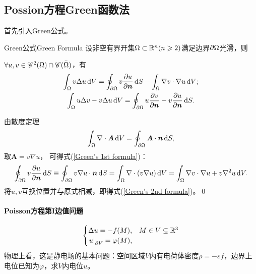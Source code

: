 \subsection{Possion方程Green函数法}
首先引入Green公式。
\begin{theorem}{Green公式}{Green Formula}
	设非空有界开集$\Omega\subset\mathbb R^n(n\geqslant 2)$满足边界$\partial\Omega$光滑，则
	
	$\forall u,v\in\mathscr C^2(\Omega)\cap\mathscr C(\bar\Omega)$，有
	\begin{gather}\label{Green's 1st formula}
		\int_\Omega v\lap u\d V=\oint_{\p\Omega}v\pv u{\bm n}\d S-\int_\Omega\nabla v\cdot\nabla u\d V;\\\label{Green's 2nd formula}
		\int_\Omega u\lap v-v\lap u\d V=\oint_{\p\Omega}u\pv v{\bm n}-v\pv u{\bm n}\d S.
	\end{gather}
\end{theorem}
\prf 由散度定理
\begin{align}
	\int_\Omega\nabla\cdot\bm A\mathop{}\!\mathrm{d} V=\oint_{\partial\Omega}\bm A\cdot\bm n\mathop{}\!\mathrm{d} S,
\end{align}
取$\bm A=v\nabla u$，
可得式(\ref{Green's 1st formula})：
\[\oint_{\p\Omega}v\pv u{\bm n}\d S\equiv\oint_{\p\Omega}v\nabla u\cdot\bm n\d S=\int_\Omega\div(v\nabla u)\d V=\int_\Omega\nabla v\cdot\nabla u+v\nabla^2u\d V.\]
将$u,v$互换位置并与原式相减，即得式(\ref{Green's 2nd formula})。\qed
\paragraph*{Poisson方程第I边值问题}
\begin{align}
	\begin{cases}
		\Delta u=-f(M),&M\in V\subseteq\mathbb R^3\\
		\left.u\right\rvert_{\partial V}=\varphi(M),
	\end{cases}
\end{align}
物理上看，这是静电场的基本问题：空间区域$V$内有电荷体密度$\rho=-\varepsilon f$，边界上电位已知为$\varphi$，求$V$内电位$u$。

